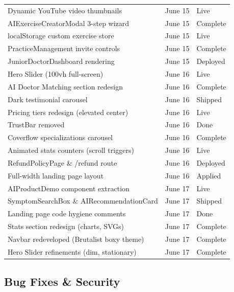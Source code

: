 \documentclass[11pt,a4paper]{article}
\begin{document}
\begin{itemize}
{\begin{table}[h!]
\begin{tabularx}{\textwidth}{X l l}
Dynamic YouTube video thumbnails          & June 15 & Live      \\
AIExerciseCreatorModal 3-step wizard      & June 15 & Complete  \\
localStorage custom exercise store        & June 15 & Live      \\
PracticeManagement invite controls        & June 15 & Complete  \\
JuniorDoctorDashboard rendering           & June 15 & Deployed  \\
Hero Slider (100vh full-screen)           & June 16 & Live      \\
AI Doctor Matching section redesign       & June 16 & Complete  \\
Dark testimonial carousel                 & June 16 & Shipped   \\
Pricing tiers redesign (elevated center)  & June 16 & Live      \\
TrustBar removed                          & June 16 & Done      \\
Coverflow specializations carousel        & June 16 & Complete  \\
Animated stats counters (scroll triggers) & June 16 & Live      \\
RefundPolicyPage \& /refund route         & June 16 & Deployed  \\
Full-width landing page layout            & June 16 & Applied   \\
AIProductDemo component extraction        & June 17 & Live      \\
SymptomSearchBox \& AIRecommendationCard  & June 17 & Shipped   \\
Landing page code hygiene comments        & June 17 & Done      \\
Stats section redesign (charts, SVGs)     & June 17 & Complete  \\
Navbar redeveloped (Brutalist boxy theme)  & June 17 & Complete  \\
Hero Slider refinements (dim, stationary)  & June 17 & Complete  \\
\bottomrule
\end{tabularx}
\end{table}

\subsection{Bug Fixes \& Security}

}
\end{itemize}
\end{document}

